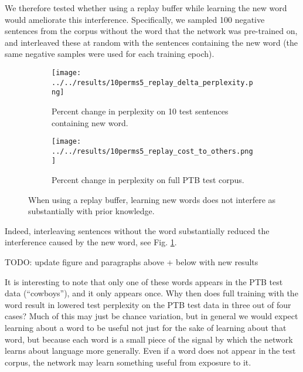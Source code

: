 \documentclass{article}
\begin{document}
We therefore tested whether using a replay buffer while learning the new word would ameliorate this interference. Specifically, we sampled 100 negative sentences from the corpus without the word that the network was pre-trained on, and interleaved these at random with the sentences containing the new word (the same negative samples were used for each training epoch). \par
\begin{figure}
\centering
\begin{subfigure}[b]{\textwidth}
\texttt{[image: ../../results/10perms5\_replay\_delta\_perplexity.png]}
\caption{Percent change in perplexity on 10 test sentences containing new word.}
\end{subfigure}
\begin{subfigure}[b]{\textwidth}
\texttt{[image: ../../results/10perms5\_replay\_cost\_to\_others.png]}
\caption{Percent change in perplexity on full PTB test corpus.}
\end{subfigure}
\caption{When using a replay buffer, learning new words does not interfere as substantially with prior knowledge.}
\label{ameliorating_interference_fig}
\end{figure}
Indeed, interleaving sentences without the word substantially reduced the interference caused by the new word, see Fig. \ref{ameliorating_interference_fig}. \par
{\color{red} TODO: update figure and paragraphs above + below with new results}\par
It is interesting to note that only one of these words appears in the PTB test data (``cowboys''), and it only appears once. Why then does full training with the word result in lowered test perplexity on the PTB test data in three out of four cases? Much of this may just be chance variation, but in general we would expect learning about a word to be useful not just for the sake of learning about that word, but because each word is a small piece of the signal by which the network learns about language more generally. Even if a word does not appear in the test corpus, the network may learn something useful from exposure to it.\par 
\end{document}
